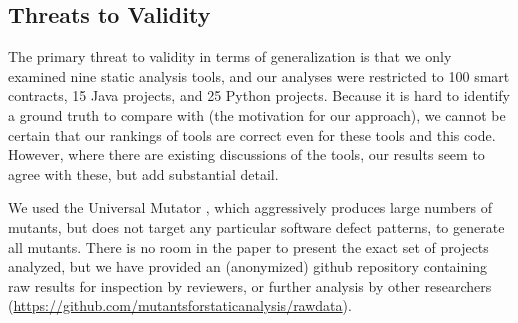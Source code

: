 \subsection{Threats to Validity}

The primary threat to validity in terms of generalization is that we only examined nine static analysis tools, and our analyses were restricted to 100 smart contracts, 15 Java projects, and 25 Python projects.   Because it is hard to identify a ground truth to compare with (the motivation for our approach), we cannot be certain that our rankings of tools are correct even for these tools and this code.  However, where there are existing discussions of the tools, our results seem to agree with these, but add substantial detail.

We used the Universal Mutator \cite{universalmutator,regexpMut}, which aggressively produces large numbers of mutants, but does not target any particular software defect patterns, to generate all mutants.
There is no room in the paper to present the exact set of projects analyzed, but we have provided an (anonymized) github repository containing raw results for inspection by reviewers, or further analysis by other researchers (\url{https://github.com/mutantsforstaticanalysis/rawdata}).
